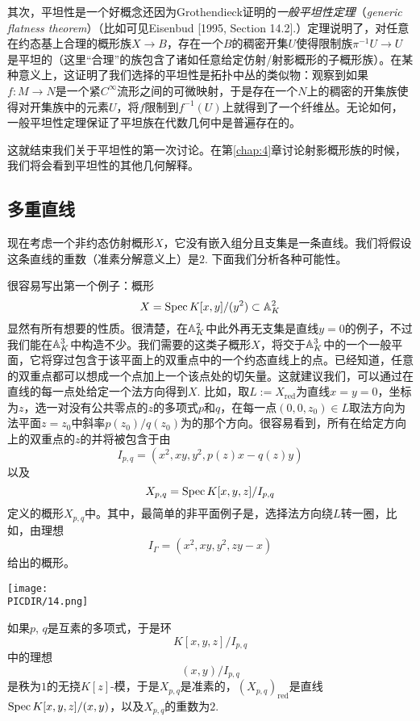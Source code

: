 其次，平坦性是一个好概念还因为Grothendieck证明的\textit{一般平坦性定理}（{\it generic flatness theorem}）（比如可见Eisenbud [1995, Section 14.2].）定理说明了，对任意在约态基上合理的概形族$X\to B$，存在一个$B$的稠密开集$U$使得限制族$\pi^{-1}U\to U$是平坦的（这里“合理”的族包含了诸如任意给定仿射/射影概形的子概形族）。在某种意义上，这证明了我们选择的平坦性是拓扑中丛的类似物：观察到如果$f:M\to N$是一个紧$C^\infty$流形之间的可微映射，于是存在一个$N$上的稠密的开集族使得对开集族中的元素$U$，将$f$限制到$f^{-1}(U)$上就得到了一个纤维丛。无论如何，一般平坦性定理保证了平坦族在代数几何中是普遍存在的。

这就结束我们关于平坦性的第一次讨论。在第\ref{chap:4}章讨论射影概形族的时候，我们将会看到平坦性的其他几何解释。

\subsection{多重直线}

现在考虑一个非约态仿射概形$X$，它没有嵌入组分且支集是一条直线。我们将假设这条直线的重数（准素分解意义上）是$2$. 下面我们分析各种可能性。

很容易写出第一个例子：概形
\[
	X=\operatorname{Spec} K[x,y]/(y^2)\subset \mathbb{A}_K^2
\]
显然有所有想要的性质。很清楚，在$\mathbb{A}_K^2$中此外再无支集是直线$y=0$的例子，不过我们能在$\mathbb{A}_K^3$中构造不少。我们需要的这类子概形$X$，将交于$\mathbb{A}_{K}^3$中的一个一般平面，它将穿过包含于该平面上的双重点中的一个约态直线上的点。\nottran 已经知道，任意的双重点都可以想成一个点加上一个该点处的切矢量。这就建议我们，可以通过在直线的每一点处给定一个法方向得到$X$. 比如，取$L:=X_{\text{red}}$为直线$x=y=0$，坐标为$z$，选一对没有公共零点的$z$的多项式$p$和$q$，在每一点$(0,0,z_0)\in L$取法方向为法平面$z=z_0$中斜率$p(z_0)/q(z_0)$为的那个方向。很容易看到，所有在给定方向上的双重点的$z$的并将被包含于由
\[
	I_{p,q}=(x^2,xy,y^2,p(z)x-q(z)y)
\]
以及
\[
	X_{p,q}=\operatorname{Spec} K[x,y,z]/I_{p,q}
\]
定义的概形$X_{p,q}$中。其中，最简单的非平面例子是，选择法方向绕$L$转一圈，比如，由理想
\[
	I_\Gamma=(x^2,xy,y^2,zy-x)
\]
给出的概形。

\begin{center}\texttt{[image: \\PICDIR/14.png]}\end{center}

\begin{exe}
如果$p$, $q$是互素的多项式，于是环
\[
	K[x,y,z]/I_{p,q}
\]
中的理想
\[
	(x,y)/I_{p,q}
\]
是秩为$1$的无挠$K[z]$\hyp 模，于是$X_{p,q}$是准素的，$(X_{p,q})_{\text{red}}$是直线$\operatorname{Spec} K[x,y,z]/(x,y)$，以及$X_{p,q}$的重数为$2$.
\end{exe}

